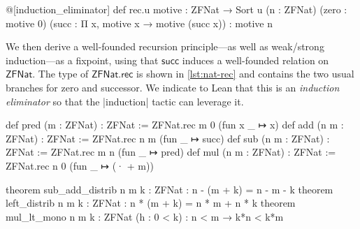 \begin{leanlisting}[title={Recursor for $\mathsf{ZFNat}$.}, label=lst:nat-rec, float=t]
@[induction_eliminator]
def rec.{u} {motive : ZFNat → Sort u} (n : ZFNat)
  (zero : motive 0) (succ : Π x, motive x → motive (succ x)) : motive n
\end{leanlisting}

We then derive a well-founded recursion principle---as well as weak/strong induction---as a fixpoint, using that $\mathsf{succ}$ induces a well-founded relation on $\mathsf{ZFNat}$.
The type of $\mathsf{ZFNat.rec}$ is shown in \cref{lst:nat-rec} and contains the two usual branches for zero and successor.
We indicate to Lean that this is an \emph{induction eliminator} so that the \inlinelean|induction| tactic can leverage it.
%
\begin{leanlisting}[title={Basic arithmetic operations on $\mathsf{ZFNat}$ and some associated facts.}, label=lst:nat-lemmas, float=t]
def pred  (m : ZFNat) : ZFNat := ZFNat.rec m 0 (fun x _ ↦ x)
def add (n m : ZFNat) : ZFNat := ZFNat.rec n m (fun _ ↦ succ)
def sub (n m : ZFNat) : ZFNat := ZFNat.rec m n (fun _ ↦ pred)
def mul (n m : ZFNat) : ZFNat := ZFNat.rec n 0 (fun _ ↦ (· + m))

theorem sub_add_distrib {n m k : ZFNat} : n - (m + k) = n - m - k
theorem left_distrib    {n m k : ZFNat} : n * (m + k) = n * m + n * k
theorem mul_lt_mono     {n m k : ZFNat} (h : 0 < k) : n < m → k*n < k*m
\end{leanlisting}

